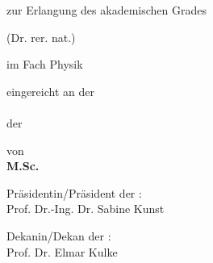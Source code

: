 \makeatletter
\begin{titlepage}
\begin{spacing}{1}
  \setlength{\parindentbak}{\parindent}
  \setlength{\parskipbak}{\parskip}

\setlength{\parindent}{0pt}
\setlength{\parskip}{\baselineskip}

\thispagestyle{empty}

\expandafter \Large\sffamily \expandafter

\begin{center}
\begin{spacing}{1.2}
\begingroup
\fontsize{18pt}{10pt}\selectfont
{\textbf{\mytitle}}
\endgroup
\end{spacing}

\vfill


zur Erlangung des akademischen Grades


(Dr. rer. nat.)

im Fach Physik

eingereicht an der \\ \myfaculty \\ der \myuni 

von\\

\textbf{M.Sc. \myname} \\

\vfill
\vfill

Pr\"asidentin/Pr\"asident der \myuni: \\
\vspace{0.2\baselineskip}
Prof. Dr.-Ing. Dr. Sabine Kunst  \\
\vspace{\baselineskip}

Dekanin/Dekan der \myfaculty: \\
\vspace{0.2\baselineskip}
Prof. Dr. Elmar Kulke  \\
\vspace{1.5\baselineskip}

\end{center}
\noindent

%

\setlength{\parindent}{\parindentbak}
\setlength{\parskip}{\parskipbak}
\end{spacing}
\end{titlepage}
\makeatother
